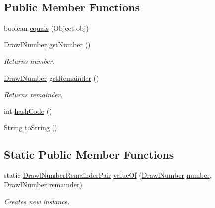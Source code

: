 \subsection*{Public Member Functions}
\begin{DoxyCompactItemize}
\item 
boolean \hyperlink{classcom_1_1aarrelaakso_1_1drawl_1_1_drawl_number_remainder_pair_ae619b9a18192478ece2b28978d892814}{equals} (Object obj)
\item 
\hyperlink{classcom_1_1aarrelaakso_1_1drawl_1_1_drawl_number}{Drawl\+Number} \hyperlink{classcom_1_1aarrelaakso_1_1drawl_1_1_drawl_number_remainder_pair_a0924839905a2c81b8bd4b2fd749e9783}{get\+Number} ()
\begin{DoxyCompactList}\small\item\em Returns number. \end{DoxyCompactList}\item 
\hyperlink{classcom_1_1aarrelaakso_1_1drawl_1_1_drawl_number}{Drawl\+Number} \hyperlink{classcom_1_1aarrelaakso_1_1drawl_1_1_drawl_number_remainder_pair_a1d30d70c9111a226e4dbf599139c7096}{get\+Remainder} ()
\begin{DoxyCompactList}\small\item\em Returns remainder. \end{DoxyCompactList}\item 
int \hyperlink{classcom_1_1aarrelaakso_1_1drawl_1_1_drawl_number_remainder_pair_aa56a76d72bd049756ea037819a8163fa}{hash\+Code} ()
\item 
String \hyperlink{classcom_1_1aarrelaakso_1_1drawl_1_1_drawl_number_remainder_pair_a4e2f7077149f0a6f6f4b66bb76a3feb0}{to\+String} ()
\end{DoxyCompactItemize}
\subsection*{Static Public Member Functions}
\begin{DoxyCompactItemize}
\item 
static \hyperlink{classcom_1_1aarrelaakso_1_1drawl_1_1_drawl_number_remainder_pair}{Drawl\+Number\+Remainder\+Pair} \hyperlink{classcom_1_1aarrelaakso_1_1drawl_1_1_drawl_number_remainder_pair_acf215ec7af4d8663e2cc0f6691b59d57}{value\+Of} (\hyperlink{classcom_1_1aarrelaakso_1_1drawl_1_1_drawl_number}{Drawl\+Number} \hyperlink{classcom_1_1aarrelaakso_1_1drawl_1_1_drawl_number_remainder_pair_a8c62602c155e6b1fe737605fe7229b36}{number}, \hyperlink{classcom_1_1aarrelaakso_1_1drawl_1_1_drawl_number}{Drawl\+Number} \hyperlink{classcom_1_1aarrelaakso_1_1drawl_1_1_drawl_number_remainder_pair_a95c7e55169d65822bbceb08ff2f800dc}{remainder})
\begin{DoxyCompactList}\small\item\em Creates new instance. \end{DoxyCompactList}\end{DoxyCompactItemize}
